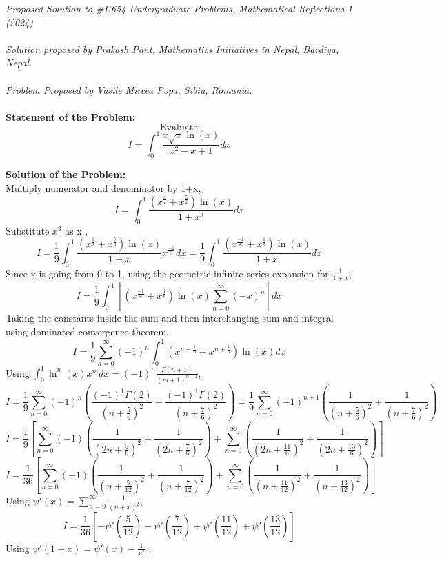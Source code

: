 \documentclass[12pt]{article}
\begin{document}
\textit{Proposed Solution to \#U654 Undergraduate Problems, Mathematical Reflections 1 (2024) }\\ \\
\textit{Solution proposed by Prakash Pant, Mathematics Initiatives in Nepal, Bardiya, Nepal.}\\ \\
\textit{Problem Proposed by Vasile Mircea Popa, Sibiu, Romania.} \\ \\
\textbf{Statement of the Problem:}
\[ \text{ Evaluate} : \]
\[ I = \int_0^1 \frac{x \sqrt{x} \ln(x)}{x^2-x+1} dx\]

\textbf{Solution of the Problem:} \\
Multiply numerator and denominator by 1+x, 
\[ I = \int_0^1 \frac{(x^{\frac{3}{2}}+x^{\frac{5}{2}}) \ln(x)}{1+x^3} dx \]
Substitute $x^3$ as x ,
\[ I = \frac{1}{9} \int_0^1 \frac{(x^{\frac{1}{2}}+x^{\frac{5}{6}}) \ln(x)}{1+x} x^{\frac{-2}{3}} dx = \frac{1}{9} \int_0^1 \frac{(x^{\frac{-1}{6}}+x^{\frac{1}{6}}) \ln(x)}{1+x} dx \]
Since x is going from 0 to 1, using the geometric infinite series expansion for $\frac{1}{1+x}$,
\[ I = \frac{1}{9} \int_0^1 \left[ (x^{\frac{-1}{6}}+x^{\frac{1}{6}}) \ln(x) \sum_{n=0}^{\infty} (-x)^n \right] dx \]
Taking the constants inside the sum and then interchanging sum and integral using dominated convergence theorem, 
\[ I = \frac{1}{9} \sum_{n=0}^{\infty} (-1)^n  \int_0^1  (x^{n-\frac{1}{6}}+x^{n+\frac{1}{6}}) \ln(x)  dx \]
Using $ \int_0^1 \ln^n(x) x^m dx = (-1)^n \frac{\Gamma(n+1)}{(m+1)^{n+1}}$,
\[ I = \frac{1}{9} \sum_{n=0}^{\infty} (-1)^n  \left( \frac{(-1)^1 \Gamma(2)}{(n+\frac{5}{6})^2} + \frac{(-1)^1 \Gamma(2)}{(n+\frac{7}{6})^2} \right) = \frac{1}{9} \sum_{n=0}^{\infty} (-1)^{n+1}  \left( \frac{1}{(n+\frac{5}{6})^2} + \frac{1}{(n+\frac{7}{6})^2} \right)  \]
\[ I = \frac{1}{9} \left[  \sum_{n=0}^{\infty}  (-1) \left(  \frac{1}{(2n+\frac{5}{6})^2} + \frac{1}{(2n+\frac{7}{6})^2} \right) +  \sum_{n=0}^{\infty}  \left( \frac{1}{(2n+\frac{11}{6})^2} + \frac{1}{(2n+\frac{13}{6})^2} \right)  \right] \]
\[ I = \frac{1}{36} \left[  \sum_{n=0}^{\infty}  (-1) \left(  \frac{1}{(n+\frac{5}{12})^2} + \frac{1}{(n+\frac{7}{12})^2} \right) +  \sum_{n=0}^{\infty}  \left( \frac{1}{(n+\frac{11}{12})^2} + \frac{1}{(n+\frac{13}{12})^2} \right)  \right] \]
Using $\psi'(x)= \sum_{n=0}^{\infty} \frac{1}{(n+x)^2}$,
\[ I = \frac{1}{36} \left[   - \psi'\left( \frac{5}{12}\right) - \psi'\left(\frac{7}{12}\right)  +   \psi'\left(\frac{11}{12}\right) +  \psi'\left(\frac{13}{12} \right)  \right] \]
Using $\psi'(1+x)= \psi'(x) - \frac{1}{x^2}$ ,
\end{document}
